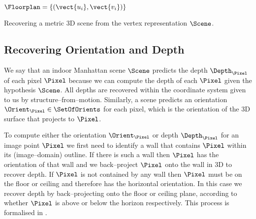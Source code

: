 \begin{algorithm}
  \begin{algorithmic}
    \ENSURE $\Floorplan=\{(\vect{u_i},\vect{v_i})\}$
    \STATE{$\Floorplan \leftarrow \emptyset$}
    \ENDFOR
  \end{algorithmic}
  \caption{\label{alg:scene-to-recon}
    Recovering a metric 3D scene from the vertex representation
    $\Scene$.}
\end{algorithm}

\subsection{Recovering Orientation and Depth}
We say that an indoor Manhattan scene $\Scene$ predicts the depth
$\Depth_{\Pixel}$ of each pixel $\Pixel$ because we can compute the
depth of each $\Pixel$ given the hypothesis $\Scene$. All depths are
recovered within the coordinate system given to us by
structure--from--motion\changedsinceviva. Similarly, a
scene predicts an orientation $\Orient_{\Pixel}\in\SetOfOrients$ for
each pixel, which is the orientation of the 3D surface that
projects to $\Pixel$.

To compute either the orientation $\Orient_{\Pixel}$ or depth
$\Depth_{\Pixel}$ for an image point $\Pixel$ we first need to
identify a wall that contains $\Pixel$ within its (image--domain)
outline. If there is such a wall then $\Pixel$ has the orientation of
that wall and we back--project $\Pixel$ onto the wall in 3D to recover
depth. If $\Pixel$ is not contained by any wall then $\Pixel$ must be
on the floor or ceiling and therefore has the horizontal
orientation. In this case we recover depth by back--projecting onto
the floor or ceiling plane, according to whether $\Pixel$ is above or
below the horizon respectively. This process is formalised in
.

